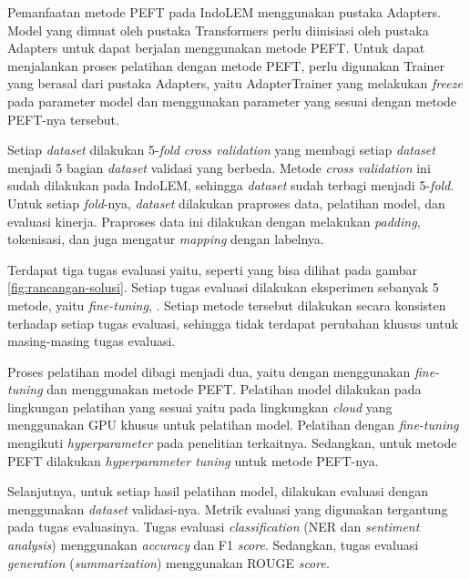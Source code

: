 Pemanfaatan metode PEFT pada IndoLEM  menggunakan pustaka Adapters. Model yang dimuat oleh pustaka Transformers perlu diinisiasi oleh pustaka Adapters untuk dapat berjalan menggunakan metode PEFT. Untuk dapat menjalankan proses pelatihan dengan metode PEFT, perlu digunakan Trainer yang berasal dari pustaka Adapters, yaitu AdapterTrainer yang  melakukan \textit{freeze} pada parameter model dan  menggunakan parameter yang sesuai dengan metode PEFT-nya tersebut.

Setiap \textit{dataset}  dilakukan 5-\textit{fold cross validation} yang membagi setiap \textit{dataset} menjadi 5 bagian \textit{dataset} validasi yang berbeda. Metode \textit{cross validation} ini sudah dilakukan pada IndoLEM, sehingga \textit{dataset} sudah terbagi menjadi 5-\textit{fold}. Untuk setiap \textit{fold}-nya, \textit{dataset}  dilakukan praproses data, pelatihan model, dan evaluasi kinerja. Praproses data ini dilakukan dengan melakukan \textit{padding}, tokenisasi, dan juga mengatur \textit{mapping} dengan labelnya. 

Terdapat tiga tugas evaluasi yaitu, \nlptask seperti yang bisa dilihat pada gambar \ref{fig:rancangan-solusi}. Setiap tugas evaluasi dilakukan eksperimen sebanyak 5 metode, yaitu \textit{fine-tuning}, \methodPEFT. Setiap metode tersebut dilakukan secara konsisten terhadap setiap tugas evaluasi, sehingga tidak terdapat perubahan khusus untuk masing-masing tugas evaluasi. 

Proses pelatihan model dibagi menjadi dua, yaitu dengan menggunakan \textit{fine-tuning} dan menggunakan metode PEFT. Pelatihan model  dilakukan pada lingkungan pelatihan yang sesuai yaitu pada lingkungkan \textit{cloud} yang menggunakan GPU khusus untuk pelatihan model. Pelatihan dengan \textit{fine-tuning} mengikuti \textit{hyperparameter} pada penelitian terkaitnya. Sedangkan, untuk metode PEFT  dilakukan \textit{hyperparameter tuning} untuk metode PEFT-nya.

Selanjutnya, untuk setiap hasil pelatihan model, dilakukan evaluasi dengan menggunakan \textit{dataset} validasi-nya. Metrik evaluasi yang digunakan tergantung pada tugas evaluasinya. Tugas evaluasi \textit{classification} (NER dan \textit{sentiment analysis})  menggunakan \textit{accuracy} dan F1 \textit{score}. Sedangkan, tugas evaluasi \textit{generation} (\textit{summarization})  menggunakan ROUGE \textit{score}.


